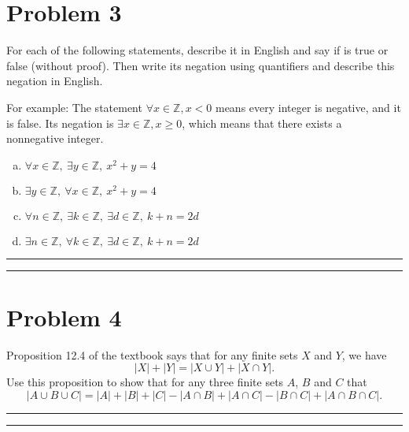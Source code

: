 \documentclass{article}
\theoremstyle{definition}
\newenvironment{solution}{\bigskip\hrule{\hfill}}{\bigskip\hrule{\hfill}} %
\begin{document}

\newpage


\section*{Problem 3}
For each of the following statements, describe it in English and say if is true or false (without proof). Then write its negation using quantifiers and describe this negation in English. \medskip

\noindent For example: The statement $\forall x\in\mathbb{Z},x<0$ means every integer is negative, and it is false. Its negation is $\exists x\in\mathbb{Z},x\geq 0$, which means that there exists a nonnegative integer.

\begin{enumerate}[a)] %
    \item $\forall x\in\mathbb{Z},~\exists y\in\mathbb{Z},~x^2+y=4$
    \item $\exists y\in\mathbb{Z},~\forall x\in\mathbb{Z},~x^2+y=4$
    \item $\forall n\in\mathbb{Z},~\exists k\in\mathbb{Z},~\exists d\in\mathbb{Z},~k+n=2d$
    \item $\exists n\in\mathbb{Z},~\forall k\in\mathbb{Z},~\exists d\in\mathbb{Z},~k+n=2d$
\end{enumerate}
\begin{solution}


\end{solution}


\newpage


\section*{Problem 4}
Proposition 12.4 of the textbook says that for any finite sets $X$ and $Y$, we have $$\left|X\right|+\left|Y\right|=\left|X\cup Y\right|+\left|X\cap Y\right|.$$ Use this proposition to show that for any three finite sets $A$, $B$ and $C$ that $$\left|A\cup B\cup C\right|=\left|A\right|+\left|B\right|+\left|C\right|-\left|A\cap B\right|+\left|A\cap C\right|-\left|B\cap C\right|+\left|A\cap B\cap C\right|.$$
\begin{solution}


\end{solution}
\end{document}
